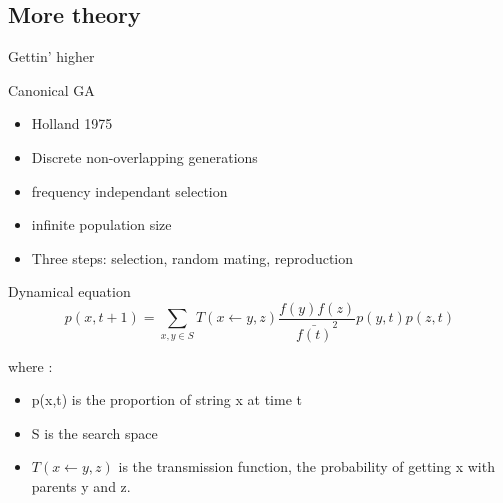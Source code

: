 \subsection{More theory}
\begin{frame}{Gettin' higher}
  \begin{block}{Canonical GA}
    \begin{itemize}
    \item Holland 1975
    \item Discrete non-overlapping generations
    \item frequency independant selection
    \item infinite population size
    \item Three steps: selection, random mating, reproduction
    \end{itemize}
  \end{block}

  \begin{block}{Dynamical equation}
    $$p(x,t+1) = \sum\limits_{x,y \in S} T(x \leftarrow y,z)
    \frac{f(y)f(z)}{\bar{f(t)}^2}p(y,t)p(z, t)$$

    where :
    \begin{itemize}
      \item p(x,t) is the proportion of string x at time t
      \item S is the search space
      \item $T(x \leftarrow y,z)$ is the transmission function, the probability of getting x with parents y and z.
    \end{itemize}
  \end{block}
\end{frame}

